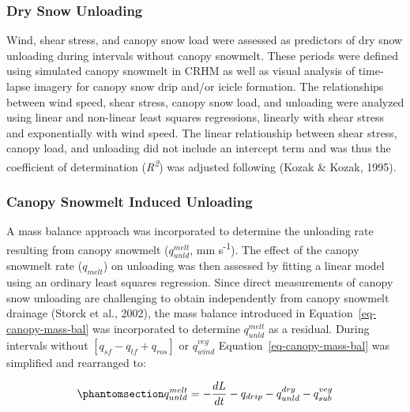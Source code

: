 \documentclass[
  letterpaper,
]{tex/uofsthesis-cs}
\begin{document}
\subsubsection{Dry Snow Unloading}\label{dry-snow-unloading}

Wind, shear stress, and canopy snow load were assessed as predictors of
dry snow unloading during intervals without canopy snowmelt. These
periods were defined using simulated canopy snowmelt in CRHM as well as
visual analysis of time-lapse imagery for canopy snow drip and/or icicle
formation. The relationships between wind speed, shear stress, canopy
snow load, and unloading were analyzed using linear and non-linear least
squares regressions, linearly with shear stress and exponentially with
wind speed. The linear relationship between shear stress, canopy load,
and unloading did not include an intercept term and was thus the
coefficient of determination (\emph{R\textsuperscript{2}}) was adjusted
following (Kozak \& Kozak, 1995).

\subsubsection{Canopy Snowmelt Induced
Unloading}\label{canopy-snowmelt-induced-unloading}

A mass balance approach was incorporated to determine the unloading rate
resulting from canopy snowmelt (\(q_{unld}^{melt}\), mm
s\textsuperscript{-1}). The effect of the canopy snowmelt rate
(\(q_{melt}\)) on unloading was then assessed by fitting a linear model
using an ordinary least squares regression. Since direct measurements of
canopy snow unloading are challenging to obtain independently from
canopy snowmelt drainage (Storck et al., 2002), the mass balance
introduced in Equation~\ref{eq-canopy-mass-bal} was incorporated to
determine \(q_{unld}^{melt}\) as a residual. During intervals without
\([q_{sf} - q_{tf} + q_{ros}]\) or \(q_{wind}^{veg}\)
Equation~\ref{eq-canopy-mass-bal} was simplified and rearranged to:

\begin{equation}\phantomsection\label{eq-unld-melt-mass-bal}{
q_{unld}^{melt} = -\frac{dL}{dt} - q_{drip} - q_{unld}^{dry} - q_{sub}^{veg}
}\end{equation}
\end{document}
